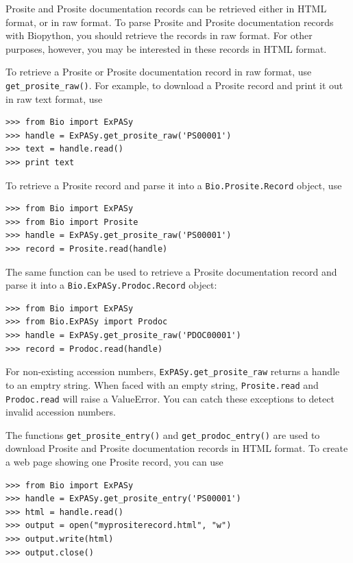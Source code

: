 \documentclass{report}
\begin{document}
Prosite and Prosite documentation records can be retrieved either in HTML format, or in raw format. To parse Prosite and Prosite documentation records with Biopython, you should retrieve the records in raw format. For other purposes, however, you may be interested in these records in HTML format.

To retrieve a Prosite or Prosite documentation record in raw format, use \verb|get_prosite_raw()|. For example, to download a Prosite record and print it out in raw text format, use

\begin{verbatim}
>>> from Bio import ExPASy
>>> handle = ExPASy.get_prosite_raw('PS00001')
>>> text = handle.read()
>>> print text
\end{verbatim}

To retrieve a Prosite record and parse it into a \verb|Bio.Prosite.Record| object, use

\begin{verbatim}
>>> from Bio import ExPASy
>>> from Bio import Prosite
>>> handle = ExPASy.get_prosite_raw('PS00001')
>>> record = Prosite.read(handle)
\end{verbatim}

The same function can be used to retrieve a Prosite documentation record and parse it into a \verb|Bio.ExPASy.Prodoc.Record| object:

\begin{verbatim}
>>> from Bio import ExPASy
>>> from Bio.ExPASy import Prodoc
>>> handle = ExPASy.get_prosite_raw('PDOC00001')
>>> record = Prodoc.read(handle)
\end{verbatim}

For non-existing accession numbers, \verb|ExPASy.get_prosite_raw| returns a handle to an emptry string. When faced with an empty string, \verb|Prosite.read| and \verb|Prodoc.read| will raise a ValueError. You can catch these exceptions to detect invalid accession numbers.

The functions \verb|get_prosite_entry()| and \verb|get_prodoc_entry()| are used to download Prosite and Prosite documentation records in HTML format. To create a web page showing one Prosite record, you can use

\begin{verbatim}
>>> from Bio import ExPASy
>>> handle = ExPASy.get_prosite_entry('PS00001')
>>> html = handle.read()
>>> output = open("myprositerecord.html", "w")
>>> output.write(html)
>>> output.close()
\end{verbatim}
\end{document}
